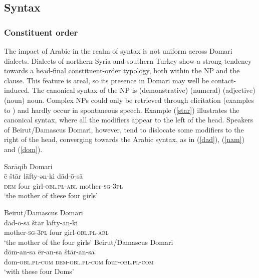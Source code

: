 \documentclass[output=paper]{langsci/langscibook}
\begin{document}
 
 \subsection{Syntax}
 \subsubsection{Constituent order}

The impact of Arabic in the realm of syntax is not uniform across Domari dialects. Dialects of northern Syria and southern Turkey show a strong tendency towards a head-final constituent-order typology, both within the NP and the clause. This feature is areal, so its presence in Domari may well be contact-induced. The canonical syntax of the NP is (demonstrative) (numeral) (adjective) (noun) noun. Complex NPs could only be retrieved through elicitation (examples  to ) and hardly occur in spontaneous speech. Example (\ref{star}) illustrates the canonical syntax, where all the modifiers appear to the left of the head. Speakers of Beirut/Damascus Domari, however, tend to dislocate some modifiers to the right of the head, converging towards the Arabic syntax, as in (\ref{dad}), (\ref{nam}) and (\ref{dom}).

\ea
{Sarāqib Domari}\\ \label{star}
\gll ē štār lāfty-ən-ki dād-ō-sā\\
     \textsc{dem} four girl-\textsc{obl.pl-abl} mother-\textsc{sg-3pl}\\
\glt ‘the mother of these four girls’
\z

\ea\label{ex:key:} \label{dad}
{Beirut/Damascus Domari}\\
\gll dād-ō-sā štār lāfty-an-ki\\
     mother-\textsc{sg-3pl} four girl-\textsc{obl.pl-abl}\\
\glt ‘the mother of the four girls’
\z
{}
\ea\label{ex:key:} \label{dom}
{Beirut/Damascus Domari}\\
\gll dōm-an-sa ēr-an-sa štār-an-sa\\
     dom-\textsc{obl.pl-com} \textsc{dem-obl.pl-com} four-\textsc{obl.pl-com}\\
\glt ‘with these four Doms’
\z
\end{document}

